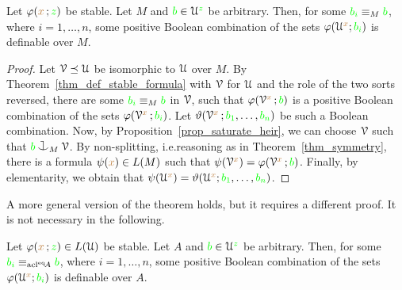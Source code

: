 \begin{theorem}\label{thm_stability_definable_rovescio1}
  Let $\varphi({\color{brown} x}\,;{\color{green} z})$ be stable.
  Let $M$ and ${\color{green} b}\in\EuScript U^{\color{green} z}$ be arbitrary.
  Then, for some ${\color{green} b_i}\equiv_M{\color{green} b}$, where $i=1,\dots,n$, some positive Boolean combination of the sets $\varphi(\EuScript U^{\color{brown} x};{\color{green} b_i})$ is definable over $M$.
\end{theorem}

\begin{proof}
  Let $\EuScript V\preceq\EuScript U$ be isomorphic to $\EuScript U$ over $M$.
  By Theorem~\ref{thm_def_stable_formula} with $\EuScript V$ for $\EuScript U$ and the role of the two sorts reversed, there are  some  ${\color{green} b_i}\equiv_M{\color{green} b}$ in $\EuScript V$, such that $\varphi(\EuScript V^{\color{brown} x}\,;{\color{green} b})$ is a positive Boolean combination of the sets $\varphi(\EuScript V^{\color{brown} x}\,;{\color{green} b_i})$.
  Let $\vartheta(\EuScript V^{\color{brown} x}\,;{\color{green} b_1},\dots,{\color{green} b_n})$ be such a Boolean combination.
  Now, by Proposition~\ref{prop_saturate_heir}, we can choose $\EuScript V$ such that ${\gr b}\cnonfork_M\V$.
  By non-splitting, i.e.\@ reasoning as in Theorem~\ref{thm_symmetry}, there is a formula $\psi({\color{brown} x})\in L(M)$ such that $\psi(\EuScript V^{\color{brown} x})=\varphi(\EuScript V^{\color{brown} x}\,;{\color{green} b})$.
  Finally, by elementarity, we obtain that $\psi(\EuScript U^{\color{brown} x})=\vartheta(\EuScript U^{\color{brown} x};{\color{green} b_1},\dots,{\color{green} b_n})$.
\end{proof}

A more general version of the theorem holds, but it requires a different proof.
It is not necessary in the following.

\begin{theorem}\label{thm_stability_definable_rovescio2}
  Let $\varphi({\color{brown} x}\,;{\color{green} z})\in L(\EuScript U)$ be stable.
  Let $A$ and ${\color{green} b}\in\EuScript U^{\color{green} z}$ be arbitrary.
  Then, for some ${\color{green} b_i}\equiv_{{\rm acl}^{{\rm eq}}\!A}{\color{green} b}$, where $i=1,\dots,n$, some positive Boolean combination of the sets $\varphi(\EuScript U^{\color{brown} x};{\color{green} b_i})$ is definable over $A$.
\end{theorem}

